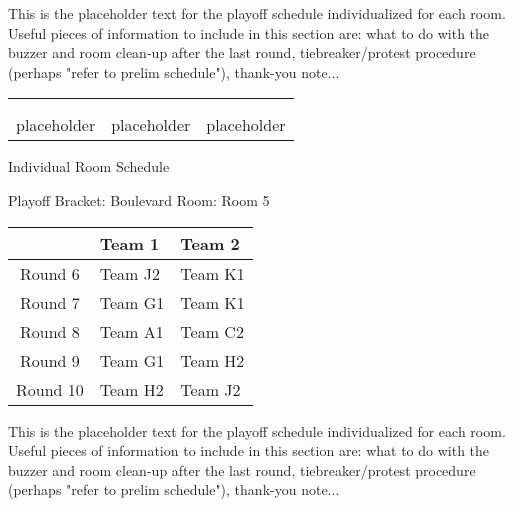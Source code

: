 \documentclass{article}%
\begin{document}
\vspace*{16pt}%
\linebreak%
This is the placeholder text for the playoff schedule individualized for each room. Useful pieces of information to include in this section are: what to do with the buzzer and room clean{-}up after the last round, tiebreaker/protest procedure (perhaps "refer to prelim schedule"), thank{-}you note...%
\vspace*{30pt}%
\newline%
%
\begin{tabularx}{\textwidth}{YYY}%
  &  &  \\%
\\%
placeholder&placeholder&placeholder\\%
\end{tabularx}%
\newpage%
\begin{center}%
\begin{Huge}%
Individual Room Schedule%
\end{Huge}%
\vspace*{16pt}%
\linebreak%
\begin{Large}%
Playoff Bracket: Boulevard \hfill Room: Room 5%
\end{Large}%
\end{center}%
%
\begin{tabularx}{\textwidth}{|c|Y|Y|}%
\hline%
&Team 1&Team 2\\%
\hline%
Round 6&Team J2&Team K1\\%
Round 7&Team G1&Team K1\\%
Round 8&Team A1&Team C2\\%
Round 9&Team G1&Team H2\\%
Round 10&Team H2&Team J2\\%
\hline%
\end{tabularx}%
\vspace*{16pt}%
\linebreak%
This is the placeholder text for the playoff schedule individualized for each room. Useful pieces of information to include in this section are: what to do with the buzzer and room clean{-}up after the last round, tiebreaker/protest procedure (perhaps "refer to prelim schedule"), thank{-}you note...%
\vspace*{30pt}%
\newline%
\end{document}
